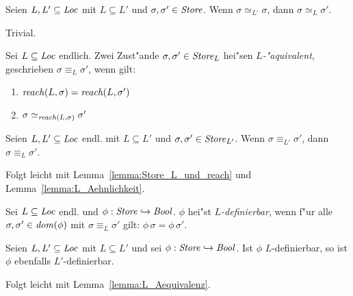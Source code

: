 \documentclass[12pt,a4paper,bigheadings]{scrartcl}
\newcommand{\reach}{\name{reach}}
\begin{document}
\begin{lemma} \label{lemma:L_Aehnlichkeit}
  Seien $L,L'\subseteq{\text{\it Loc\/}}$ mit $L \subseteq L'$ und $\sigma,\sigma'\in{\text{\it Store\/}}$. Wenn $\sigma \simeq_{L'} \sigma$,
  dann $\sigma \simeq_L \sigma'$.
\end{lemma}

\begin{beweis}
  Trivial.
\end{beweis}

\begin{definition}[$L$-"Aquivalenz]
  Sei $L \subseteq {\text{\it Loc\/}}$ endlich. Zwei Zust"ande $\sigma,\sigma'\in{\text{\it Store\/}}_L$ hei"sen {\em $L$-"aquivalent}, geschrieben
  $\sigma \equiv_L \sigma'$, wenn gilt:
  \begin{enumerate}
    \item $\reach(L,\sigma) = \reach(L,\sigma')$
    \item $\sigma \simeq_{\reach(L,\sigma)} \sigma'$
  \end{enumerate}
\end{definition}

\begin{lemma} \label{lemma:L_Aequivalenz}
  Seien $L,L'\subseteq{\text{\it Loc\/}}$ endl. mit $L \subseteq L'$ und $\sigma,\sigma'\in{\text{\it Store\/}}_{L'}$. Wenn $\sigma \equiv_{L'} \sigma'$,
  dann $\sigma \equiv_L \sigma'$.
\end{lemma}

\begin{beweis}
  Folgt leicht mit Lemma~\ref{lemma:Store_L_und_reach} und Lemma~\ref{lemma:L_Aehnlichkeit}.
\end{beweis}

\begin{definition}[$L$-Definierbarkeit]
  Sei $L \subseteq {\text{\it Loc\/}}$ endl. und $\phi:{\text{\it Store\/}}\hookrightarrow{\text{\it Bool\/}}$.
  $\phi$ hei"st {\em $L$-definierbar}, wenn f"ur alle $\sigma,\sigma'\in{\text{\it dom\/}}(\phi)$ mit
  $\sigma \equiv_L \sigma'$ gilt: $\phi\,\sigma = \phi\,\sigma'$.
\end{definition}

\begin{lemma} \label{lemma:L_Definierbarkeit}
  Seien $L,L'\subseteq{\text{\it Loc\/}}$ mit $L \subseteq L'$ und sei $\phi:{\text{\it Store\/}} \hookrightarrow {\text{\it Bool\/}}$. Ist $\phi$ $L$-definierbar,
  so ist $\phi$ ebenfalls $L'$-definierbar.
\end{lemma}

\begin{beweis}
  Folgt leicht mit Lemma~\ref{lemma:L_Aequivalenz}.
\end{beweis}
\end{document}
